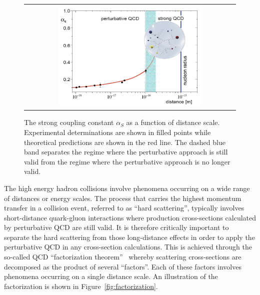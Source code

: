 \begin{figure}[tbh!]
 \begin{center}
 \begin{tabular}{c}
 \includegraphics[width=0.7\textwidth]{figures/Part1/QCD/pQCD}
 \end{tabular}
 \caption{The strong coupling constant $\alpha_{S}$ as a function of distance scale. Experimental determinations are shown in filled points while theoretical predictions are shown in the red line. The dashed blue band separates the regime where the perturbative approach is still valid from the regime where the perturbative approach is no longer valid.~\cite{Messchendorp:2013ysj}}
 \label{fig:pQCD}
 \end{center}
\end{figure}

The high energy hadron collisions involve phenomena occurring on a wide range of distances or energy scales. The process that carries the highest momentum transfer in a collision event, referred to as ``hard scattering'', typically involves short-distance quark-gluon interactions where production cross-sections calculated by perturbative \ac{QCD} are still valid. It is therefore critically important to separate the hard scattering from those long-distance effects in order to apply the perturbative \ac{QCD} in any cross-section calculations. This is achieved through the so-called \ac{QCD} ``factorization theorem''~\cite{Collins:1989gx} whereby scattering cross-sections are decomposed as the product of several ``factors''. Each of these factors involves phenomena occurring on a single distance scale. An illustration of the factorization is shown in Figure~\ref{fig:factorization}.

